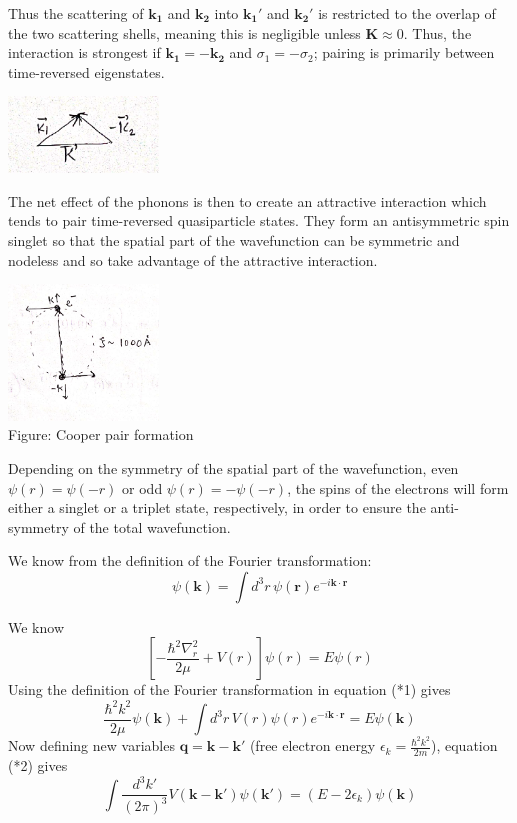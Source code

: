\documentclass{article}
\begin{document}
Thus the scattering of $\mathbf{k_1}$ and $\mathbf{k_2}$ into $\mathbf{k_1'}$ and $\mathbf{k_2'}$ is restricted to the overlap of the two scattering shells, meaning this is negligible unless $\mathbf{K} \approx 0$. Thus, the interaction is strongest if $\mathbf{k_1} = -\mathbf{k_2}$ and $\sigma_1 = -\sigma_2$; pairing is primarily between time-reversed eigenstates.

\begin{center}
    \includegraphics[width=0.3\textwidth]{figures/scattering_diagram_2.png}
\end{center}

The net effect of the phonons is then to create an attractive interaction which tends to pair time-reversed quasiparticle states. They form an antisymmetric spin singlet so that the spatial part of the wavefunction can be symmetric and nodeless and so take advantage of the attractive interaction.

\begin{center}
    \includegraphics[width=0.3\textwidth]{figures/pairing.png} \\
    Figure: Cooper pair formation
\end{center}

Depending on the symmetry of the spatial part of the wavefunction, even $\psi(r) = \psi(-r)$ or odd $\psi(r) = -\psi(-r)$, the spins of the electrons will form either a singlet or a triplet state, respectively, in order to ensure the anti-symmetry of the total wavefunction.

We know from the definition of the Fourier transformation:
\[
\psi(\mathbf{k}) = \int d^3r \, \psi(\mathbf{r}) e^{-i\mathbf{k} \cdot \mathbf{r}} \tag{1}
\]

We know
\[
\left[ -\frac{\hbar^2 \nabla_r^2}{2\mu} + V(r) \right] \psi(r) = E \psi(r) \tag{*1}
\]
Using the definition of the Fourier transformation in equation (*1) gives
\[
\frac{\hbar^2 k^2}{2\mu} \psi(\mathbf{k}) + \int d^3r \, V(r) \psi(r) e^{-i\mathbf{k} \cdot \mathbf{r}} = E \psi(\mathbf{k}) \tag{*2}
\]
Now defining new variables $\mathbf{q} = \mathbf{k} - \mathbf{k}'$ (free electron energy $\epsilon_k = \frac{\hbar^2 k^2}{2m}$), equation (*2) gives
\[
\int \frac{d^3 k'}{(2\pi)^3} V(\mathbf{k} - \mathbf{k'}) \psi(\mathbf{k'}) = (E - 2\epsilon_k) \psi(\mathbf{k}) \tag{*3}
\]
\end{document}
